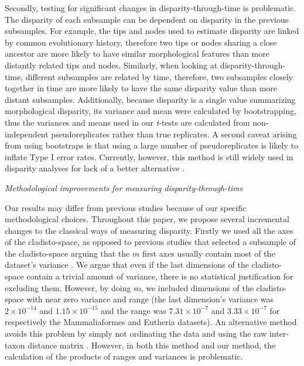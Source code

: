 \documentclass[12pt,letterpaper]{article}
\renewcommand{\subsection}[1]{%
\bigskip
\begin{center}
\begin{large}
\normalfont\itshape #1
\end{large}
\end{center}}
\begin{document}

Secondly, testing for significant changes in disparity-through-time is problematic.
The disparity of each subsample can be dependent on disparity in the previous subsamples.
For example, the tips and nodes used to estimate disparity are linked by common evolutionary history, therefore two tips or nodes sharing a close ancestor are more likely to have similar morphological features than more distantly related tips and nodes.
Similarly, when looking at disparity-through-time, different subsamples are related by time, therefore, two subsamples closely together in time are more likely to have the same disparity value than more distant subsamples.
Additionally, because disparity is a single value summarizing morphological disparity, its variance and mean were calculated by bootstrapping, thus the variances and means used in our \textit{t}-tests are calculated from non-independent pseudoreplicates rather than true replicates.
A second caveat arising from using bootstraps is that using a large number of pseudoreplicates is likely to inflate Type I error rates. 
Currently, however, this method is still widely used in disparity analyses for lack of a better alternative \citep[e.g.][]{anderson2012using,zelditch2012geometric,smith2014joined}.

\subsection{Methodological improvements for measuring disparity-through-time}
Our results may differ from previous studies because of our specific methodological choices.
Throughout this paper, we propose several incremental changes to the classical ways of measuring disparity.
Firstly we used all the axes of the cladisto-space, as opposed to previous studies that selected a subsample of the cladisto-space arguing that the $m$ first axes usually contain most of the dataset's variance \citep[e.g][]{brusatte50,cisneros2010,prentice2011,anderson2012using,Hughes20082013,bentonmodels2014}.
We argue that even if the last dimensions of the cladisto-space contain a trivial amount of variance, there is no statistical justification for excluding them.
However, by doing so, we included dimensions of the cladisto-space with near zero variance and range (the last dimension's variance was $2\times10^{-14}$ and $1.15\times10^{-15}$ and the range was $7.31\times10^{-7}$ and $3.33\times10^{-7}$ for respectively the Mammaliaformes and Eutheria datasets).
An alternative method avoids this problem by simply not ordinating the data and using the raw inter-taxon distance matrix \citep[e.g.][]{bensonfaunal2014,Close2015}. 
However, in both this method and our method, the calculation of the products of ranges and variances is problematic.
\end{document}
